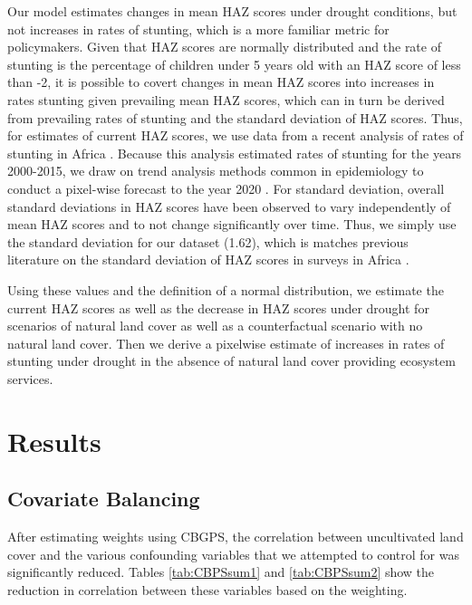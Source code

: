 \documentclass{article}
\begin{document}
Our model estimates changes in mean HAZ scores under drought conditions, but not increases in rates of stunting, which is a more familiar metric for policymakers. Given that HAZ scores are normally distributed and the rate of stunting is the percentage of children under 5 years old with an HAZ score of less than -2, it is possible to covert changes in mean HAZ scores into increases in rates stunting given prevailing mean HAZ scores, which can in turn be derived from prevailing rates of stunting and the standard deviation of HAZ scores.  Thus, for estimates of current HAZ scores, we use data from a recent analysis of rates of stunting in Africa \cite{Osgood-Zimmerman2018}.  Because this analysis estimated rates of stunting for the years 2000-2015, we draw on trend analysis methods common in epidemiology to conduct a pixel-wise forecast to the year 2020 \cite{Fullman2017, Osgood-Zimmerman2018}.  For standard deviation, overall standard deviations in HAZ scores have been observed to vary independently of mean HAZ scores \cite{Mei2007} and to not change significantly over time.  Thus, we simply use the standard deviation for our dataset (1.62), which is matches previous literature on the standard deviation of HAZ scores in surveys in Africa \cite{Mei2007}.

Using these values and the definition of a normal distribution, we estimate the current HAZ scores as well as the decrease in HAZ scores under drought for scenarios of natural land cover as well as a counterfactual scenario with no natural land cover.  Then we derive a pixelwise estimate of increases in rates of stunting under drought in the absence of natural land cover providing ecosystem services.

\section{Results}
\subsection{Covariate Balancing}
After estimating weights using CBGPS, the correlation between uncultivated land cover and the various confounding variables that we attempted to control for was significantly reduced.  Tables \ref{tab:CBPSsum1} and \ref{tab:CBPSsum2} show the reduction in correlation between these variables based on the weighting.
\end{document}
